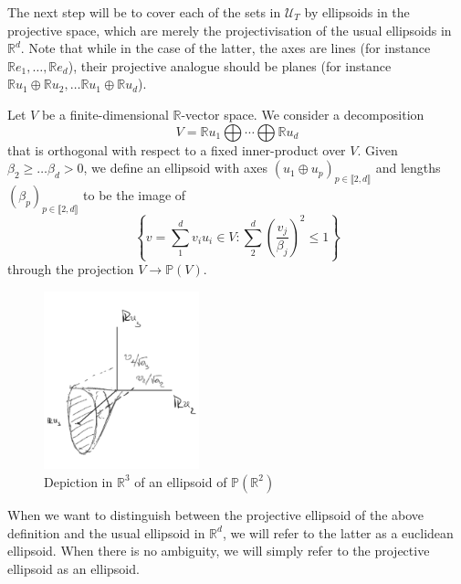 \documentclass{report}
\begin{document}
The next step will be to cover each of the sets in $\mathcal U_T$ by ellipsoids in the projective space, which are merely the projectivisation of the usual ellipsoids in $\mathbb R^d$.
Note that while in the case of the latter, the axes are lines (for instance $\mathbb Re_1, \ldots, \mathbb Re_d$), their projective analogue should be planes (for instance $\mathbb R u_1 \oplus \mathbb R u_2, \ldots \mathbb R u_1 \oplus \mathbb R u_d$).
\begin{definition}
    Let $V$ be a finite-dimensional $\mathbb R$-vector space.
    We consider a decomposition
    \[
        V = \mathbb R u_1 \bigoplus \cdots \bigoplus \mathbb R u_d
    \] 
    that is orthogonal with respect to a fixed inner-product over $V$.
    Given $\beta_2 \geq \ldots \beta_d > 0$, we define an ellipsoid with axes $\left(u_1 \oplus u_p\right)_{p \in \llbracket 2, d \rrbracket}$ and lengths $(\beta_p)_{p \in \llbracket 2, d \rrbracket}$ to be the image of
    \[
        \left\{
            v = \sum_1^d v_i u_i\in V : \sum_2^d \left( \frac{v_j}{\beta_j} \right)^2 \leq 1
        \right\}
    \]
    through the projection $ V \to \mathbb P (V)$.
\end{definition}
\begin{figure}[h]
    \centering
    \includegraphics[width=0.4\textwidth]{ellipsoid.jpg}
    \caption{Depiction in $\mathbb R^3$ of an ellipsoid of $\mathbb P(\mathbb R^2)$}
    \label{fig:ellipsoid}
\end{figure}
When we want to distinguish between the projective ellipsoid of the above definition and the usual ellipsoid in $\mathbb R^d$, we will refer to the latter as a euclidean ellipsoid.
When there is no ambiguity, we will simply refer to the projective ellipsoid as an ellipsoid.
\end{document}

